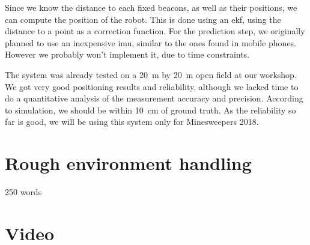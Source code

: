 Since we know the distance to each fixed beacons, as well as their positions, we can compute the position of the robot.
This is done using an \gls{ekf}, using the distance to a point as a correction function.
For the prediction step, we originally planned to use an inexpensive \gls{imu}, similar to the ones found in mobile phones.
However we probably won't implement it, due to time constraints.

The system was already tested on a \SI{20}{\meter} by \SI{20}{\meter} open field at our workshop.
We got very good positioning results and reliability, although we lacked time to do a quantitative analysis of the measurement accuracy and precision.
According to simulation, we should be within \SI{10}{\centi\meter} of ground truth.
As the reliability so far is good, we will be using this system only for Minesweepers 2018.


\section{Rough environment handling}

250 words

\section{Video}
